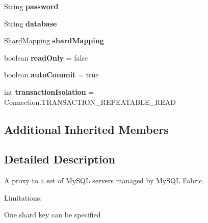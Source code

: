 \begin{DoxyCompactItemize}
String {\bfseries password}
\item 
\mbox{\label{classcom_1_1mysql_1_1fabric_1_1jdbc_1_1_fabric_my_s_q_l_connection_proxy_a740cb8e717049ce8026130bd94a57c36}} 
String {\bfseries database}
\item 
\mbox{\label{classcom_1_1mysql_1_1fabric_1_1jdbc_1_1_fabric_my_s_q_l_connection_proxy_abbd967d6a2cbcb023bdaae7998fb7d4f}} 
\mbox{\hyperlink{classcom_1_1mysql_1_1fabric_1_1_shard_mapping}{Shard\+Mapping}} {\bfseries shard\+Mapping}
\item 
\mbox{\label{classcom_1_1mysql_1_1fabric_1_1jdbc_1_1_fabric_my_s_q_l_connection_proxy_ab700eb7899634d8ff9cd2abe3f7b30b1}} 
boolean {\bfseries read\+Only} = false
\item 
\mbox{\label{classcom_1_1mysql_1_1fabric_1_1jdbc_1_1_fabric_my_s_q_l_connection_proxy_a3bde5aedde5dafb408fdb3867287991a}} 
boolean {\bfseries auto\+Commit} = true
\item 
\mbox{\label{classcom_1_1mysql_1_1fabric_1_1jdbc_1_1_fabric_my_s_q_l_connection_proxy_ae8635cfe2957a8fd860297dca05cef1b}} 
int {\bfseries transaction\+Isolation} = Connection.\+T\+R\+A\+N\+S\+A\+C\+T\+I\+O\+N\+\_\+\+R\+E\+P\+E\+A\+T\+A\+B\+L\+E\+\_\+\+R\+E\+AD
\end{DoxyCompactItemize}
\subsection*{Additional Inherited Members}


\subsection{Detailed Description}
A proxy to a set of My\+S\+QL servers managed by My\+S\+QL Fabric.

Limitations\+: 
\begin{DoxyItemize}
\item One shard key can be specified 
\end{DoxyItemize}

